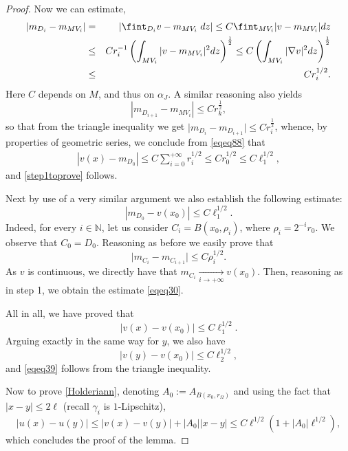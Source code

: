 \documentclass[12pt]{article}
\theoremstyle{definition}
\theoremstyle{remark}
\numberwithin{equation}{section}
\newcommand{\abs}[1]{\lvert #1 \rvert}
\newcommand{\N}{\mathbb{N}}
\begin{document}
\begin{proof}
    Now we can estimate,
    \begin{eqnarray}
        |m_{D_i}-m_{MV_i}|&=& \left|\fint_{D_i} v - m_{MV_i} \;dz\right|\leq C \fint_{MV_i}|v-m_{MV_i}|  dz  \notag \\
                          &\leq&  C r_i^{-1}  \left(\int_{MV_i}|v-m_{MV_i}|^2  dz \right)^{\frac{1}{2}}
                          \leq  C\left(  \int_{MV_i}|\nabla v|^2  dz \right)^{\frac{1}{2}} \notag \\
                          &\leq & Cr_i^{1/2}.
    \end{eqnarray}
    Here $C$ depends on $M$, and thus on $\alpha_J$. A similar reasoning also yields 
    \[|m_{D_{i+1}}-m_{MV_i}|\leq  Cr_k^{\frac{1}{2}},\] 
    so that from  the triangle inequality we get $  \abs{m_{D_i} - m_{D_{i+1}}} \leq C r_i^{\frac{1}{2}}$,
    whence, by properties of geometric series, we conclude from \eqref{eqeq88} that
    \begin{align}
        |v(x)-m_{D_0}|  \leq C \sum_{i=0}^{+\infty} r_i^{1/2}  \leq C r_0^{1/2}  \leq C \ell_1^{1/2},
    \end{align}
    and \eqref{step1toprove} follows.

    \medskip


    Next by use of a very similar argument we also establish   the following estimate:
    \begin{equation}
        \label{eqeq30}
        |m_{D_0}-v(x_0)|\leq C\ell_1^{1/2}.
    \end{equation}
    Indeed, for every $i\in\N$, let us consider $C_i=B(x_0,\rho_i)$, where $\rho_i=2^{-i}r_0$. We observe that $C_0=D_0$.  Reasoning as before we easily prove that 
    \[    \abs{m_{C_i} - m_{C_{i+1}}}\leq C\rho_i^{1/2}.\]
    As $v$ is continuous, we directly have that $m_{C_i} \xrightarrow[i \to +\infty]{} v(x_0)$.
    Then, reasoning as in step 1, we obtain the estimate \eqref{eqeq30}.


    \medskip


    All in all, we have proved that 
    \[|v(x)-v(x_0)|\leq C \ell_1^{1/2}.\]
    Arguing exactly in the same way for $y$, we also have 
    \begin{equation}
        \label{eqeq37}
        |v(y)-v(x_0)|\leq C\ell_2^{1/2},
    \end{equation}
    and  \eqref{eqeq39} follows from the triangle inequality.

    Now to prove \eqref{Holderiann}, denoting $A_0:=A_{B(x_0,r_\Omega)}$ and using the fact that $|x-y|\leq 2\ell$ (recall
    $\gamma_i$ is $1$-Lipschitz),
    \begin{equation}
        |u(x)-u(y)|\leq |v(x)-v(y)|+|A_0||x-y|\leq C\ell^{1/2}(1+|A_0|\ell^{1/2}),
    \end{equation}
    which concludes the proof of the lemma.
\end{proof}
\end{document}
